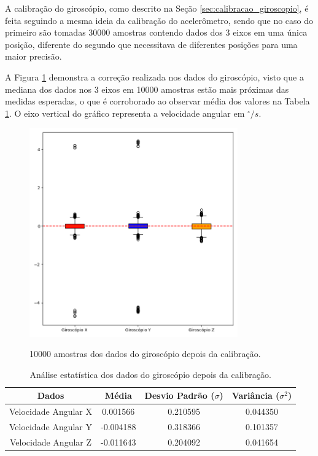 \documentclass[acronym, symbols, table]{fei}
\begin{document}
	A calibração do giroscópio, como descrito na Seção \ref{sec:calibracao_giroscopio}, é feita seguindo a mesma ideia da calibração do acelerômetro, sendo que no caso do primeiro são tomadas 30000 amostras contendo dados dos 3 eixos em uma única posição, diferente do segundo que necessitava de diferentes posições para uma maior precisão.
	
	A Figura \ref{fig:dados_giroscopio_certo} demonstra a correção realizada nos dados do giroscópio, visto que a mediana dos dados nos 3 eixos em 10000 amostras estão mais próximas das medidas esperadas, o que é corroborado ao observar média dos valores na Tabela \ref{tab:giroscopio_depois_calibracao}. O eixo vertical do gráfico representa a velocidade angular em $^\circ/s$.
	
	\begin{figure}[!htb]
		\centering
		\caption{10000 amostras dos dados do giroscópio depois da calibração.}
		\includegraphics[width=0.8\textwidth]{dados_giroscopio_certos.png}
		\label{fig:dados_giroscopio_certo}
	\end{figure}
	
	\begin{table}[!htb]
		\centering
		\caption{Análise estatística dos dados do giroscópio depois da calibração.}\label{tab:giroscopio_depois_calibracao}
		\begin{tabular}{|c|c|c|c|}
			\hline
			Dados & Média & Desvio Padrão ($\sigma$) & Variância ($\sigma^2$) \\ \hline
			\small Velocidade Angular X & 0.001566  & 0.210595 & 0.044350 \\ \hline
			\small Velocidade Angular Y & -0.004188  & 0.318366 & 0.101357 \\ \hline
			\small Velocidade Angular Z & -0.011643 & 0.204092 & 0.041654 \\ \hline	
		\end{tabular}
	\end{table}
	
\end{document}
